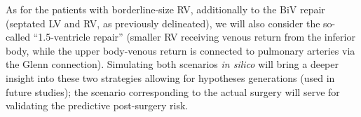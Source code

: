 As for the patients with borderline-size RV, additionally to the BiV repair (septated LV and RV, as previously delineated), we will also consider the so-called ``1.5-ventricle repair'' (smaller RV receiving venous return from the inferior body, while the upper body-venous return is connected to pulmonary arteries via the Glenn connection).  Simulating both scenarios {\it in silico} will bring a deeper insight into these two strategies allowing for hypotheses generations (used in future studies); the scenario corresponding to the actual surgery will serve for validating the predictive post-surgery risk. 




